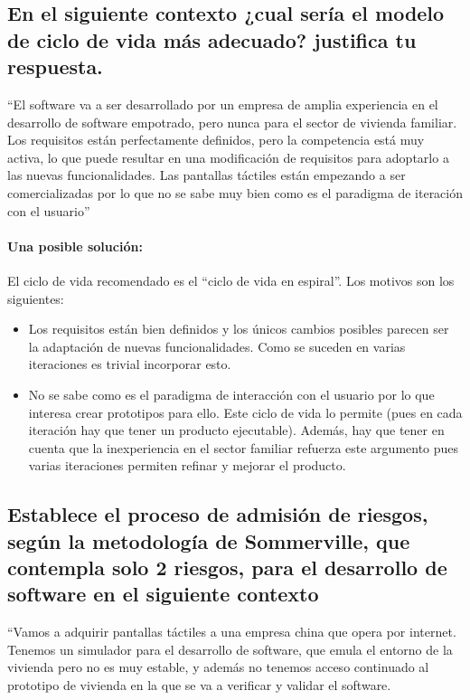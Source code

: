 \subsection{En el siguiente contexto ¿cual sería el modelo de ciclo de vida más adecuado? justifica tu respuesta.}
``El software va a ser desarrollado por un empresa de amplia experiencia en el desarrollo de software empotrado, pero nunca para el sector de vivienda familiar. Los requisitos están perfectamente definidos, pero la competencia está muy activa, lo que puede resultar en una modificación de requisitos para adoptarlo a las nuevas funcionalidades. Las pantallas táctiles están empezando a ser comercializadas por lo que no se sabe muy bien como es el paradigma de iteración con el usuario''

\paragraph{Una posible solución:} El ciclo de vida recomendado es el ``ciclo de vida en espiral''. Los motivos son los siguientes:
\begin{itemize}
\item Los requisitos están bien definidos y los únicos cambios posibles parecen ser la adaptación de nuevas funcionalidades. Como se suceden en varias iteraciones es trivial incorporar esto.
\item No se sabe como es el paradigma de interacción con el usuario por lo que interesa crear prototipos para ello. Este ciclo de vida lo permite (pues en cada iteración hay que tener un producto ejecutable). Además, hay que tener en cuenta que la inexperiencia en el sector familiar refuerza este argumento pues varias iteraciones permiten refinar y mejorar el producto.
\end{itemize}

\subsection{Establece el proceso de admisión de riesgos, según la metodología de Sommerville, que contempla solo 2 riesgos, para el desarrollo de software en el siguiente contexto}
``Vamos a adquirir pantallas táctiles a una empresa china que opera por internet. Tenemos un simulador para el desarrollo de software, que emula el entorno de la vivienda pero no es muy estable, y además no tenemos acceso continuado al prototipo de vivienda en la que se va a verificar y validar el software.

